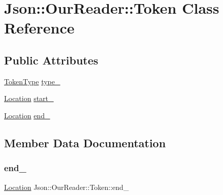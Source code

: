 \hypertarget{classJson_1_1OurReader_1_1Token}{}\section{Json\+:\+:Our\+Reader\+:\+:Token Class Reference}
\label{classJson_1_1OurReader_1_1Token}
\subsection*{Public Attributes}
\begin{DoxyCompactItemize}
\item 
\hyperlink{classJson_1_1OurReader_a15116f7276ddf1e7a2cc3cbefa884dcc_a15116f7276ddf1e7a2cc3cbefa884dcc}{Token\+Type} \hyperlink{classJson_1_1OurReader_1_1Token_abe7d858530396fa7e1293f7a579880ed_abe7d858530396fa7e1293f7a579880ed}{type\+\_\+}
\item 
\hyperlink{classJson_1_1OurReader_a1bdc7bbc52ba87cae6b19746f2ee0189_a1bdc7bbc52ba87cae6b19746f2ee0189}{Location} \hyperlink{classJson_1_1OurReader_1_1Token_aedf68bb00eaaa9d3c22b9825999602ac_aedf68bb00eaaa9d3c22b9825999602ac}{start\+\_\+}
\item 
\hyperlink{classJson_1_1OurReader_a1bdc7bbc52ba87cae6b19746f2ee0189_a1bdc7bbc52ba87cae6b19746f2ee0189}{Location} \hyperlink{classJson_1_1OurReader_1_1Token_a67d2071638add857528579ae3791eccc_a67d2071638add857528579ae3791eccc}{end\+\_\+}
\end{DoxyCompactItemize}


\subsection{Member Data Documentation}
\mbox{\label{classJson_1_1OurReader_1_1Token_a67d2071638add857528579ae3791eccc_a67d2071638add857528579ae3791eccc}} 
\subsubsection{\texorpdfstring{end\+\_\+}{end\_}}
{\footnotesize\ttfamily \hyperlink{classJson_1_1OurReader_a1bdc7bbc52ba87cae6b19746f2ee0189_a1bdc7bbc52ba87cae6b19746f2ee0189}{Location} Json\+::\+Our\+Reader\+::\+Token\+::end\+\_\+}



